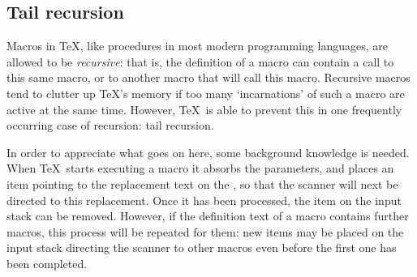 \documentclass[letterpaper]{book}
\begin{document}
\subsection{Tail recursion}

Macros in \TeX, like procedures in most modern programming
languages, are allowed to be \emph{recursive}: that is, the 
definition of a macro can contain a call to this same macro,
or to another macro that will call this macro.
Recursive macros tend to clutter up \TeX's memory
if too many `incarnations' of such a macro are active
at the same time. However, \TeX\ is able to prevent this
in one frequently occurring case of recursion: tail recursion.

In order to  appreciate what goes on here, some background
knowledge is needed. When \TeX\ starts executing a macro
it absorbs the parameters, and places an item pointing to
the replacement text on the ,
so that the scanner will next be directed to
this replacement. Once it has been processed, the item on the 
input stack can be removed.
However, if the definition text
of a macro contains further macros, this process will be
repeated for them: new items may be placed on the input stack
directing the scanner to other macros
even before the first one has been completed.
\end{document}
